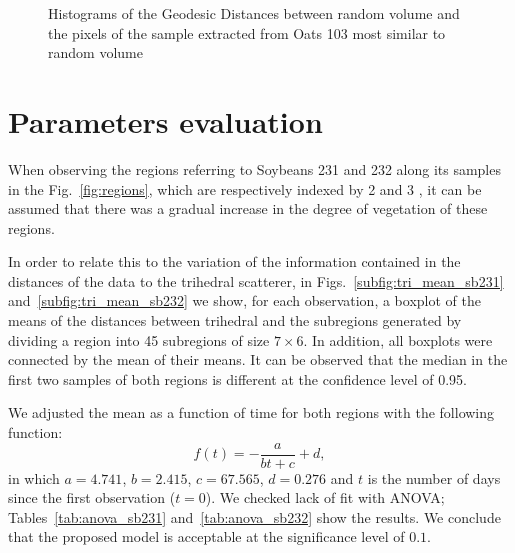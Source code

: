 \documentclass[12pt]{article}
\begin{document}
\begin{figure}[hbt]
\centering
{}
\caption{Histograms of the Geodesic Distances between random volume and the pixels of the sample extracted from Oats 103 most similar to random volume}
\label{fig:ot103_hist_rv}
\end{figure}

\section{Parameters evaluation}
When observing the regions referring to Soybeans 231 and 232 along its samples in the Fig.~\ref{fig:regions}, which are respectively indexed by 2 and 3 , it can be assumed that there was a gradual increase in the degree of vegetation of these regions.

In order to relate this to the variation of the information contained in the distances of the data to the trihedral scatterer, in Figs.~\ref{subfig:tri_mean_sb231} and~\ref{subfig:tri_mean_sb232} we show, for each observation, a boxplot of the means of the distances between trihedral and the subregions generated by dividing a region into 45 subregions of size $7\times 6$.
In addition, all boxplots were connected by the mean of their means. It can be observed that the median in the first two samples of both regions is different at the confidence level of 0.95.

We adjusted the mean as a function of time for both regions with the following function:
\begin{equation}
f(t) = -\frac{a}{bt + c} + d,
\end{equation}
in which $a = 4.741$, $b = 2.415$, $c = 67.565$, $d = 0.276$ and $t$ is the number of days since the first observation ($t = 0$).
We checked lack of fit with ANOVA; Tables~\ref{tab:anova_sb231} and~\ref{tab:anova_sb232} show the results.
We conclude that the proposed model is acceptable at the significance level of $0.1$.
\end{document}
